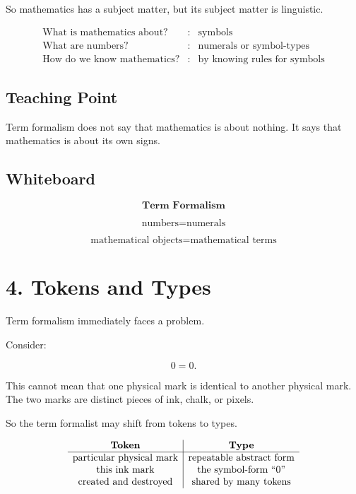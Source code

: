 \documentclass[11pt]{article}
\begin{document}
So mathematics has a subject matter, but its subject matter is linguistic.

\[
\begin{array}{rcl}
\text{What is mathematics about?} &:& \text{symbols} \\
\text{What are numbers?} &:& \text{numerals or symbol-types} \\
\text{How do we know mathematics?} &:& \text{by knowing rules for symbols}
\end{array}
\]

\subsection*{Teaching Point}

Term formalism does not say that mathematics is about nothing. It says that mathematics
is about its own signs.

\subsection*{Whiteboard}

\[
\textbf{Term Formalism}
\]

\[
\text{numbers} = \text{numerals}
\]

\[
\text{mathematical objects} = \text{mathematical terms}
\]

\section*{4. Tokens and Types}

Term formalism immediately faces a problem.

Consider:

\[
0=0.
\]

This cannot mean that one physical mark is identical to another physical mark. The two
marks are distinct pieces of ink, chalk, or pixels.

So the term formalist may shift from tokens to types.

\[
\begin{array}{c|c}
\textbf{Token} & \textbf{Type} \\
\hline
\text{particular physical mark} & \text{repeatable abstract form} \\
\text{this ink mark} & \text{the symbol-form } ``0" \\
\text{created and destroyed} & \text{shared by many tokens}
\end{array}
\]
\end{document}
